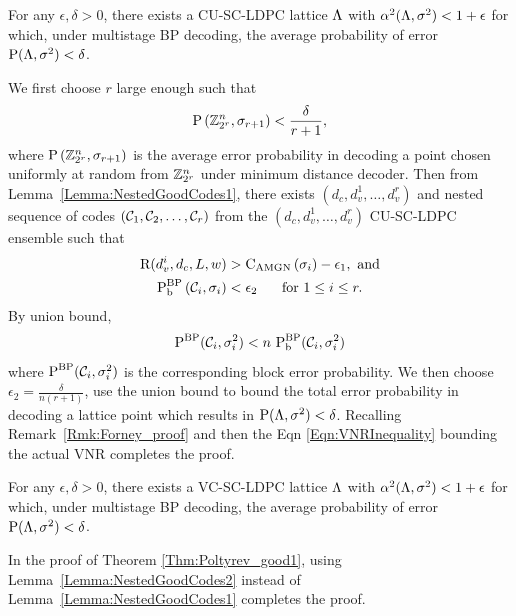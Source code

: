 \documentclass[journal,twocolumn]{IEEEtran}
\begin{document}
\begin{theorem}\label{Thm:Poltyrev_good1}
   For any $\epsilon,\delta>0$, there exists a CU-SC-LDPC lattice $\Lambda$ with $\alpha^2(\Lambda,\sigma^2)<1+\epsilon$ for which, under multistage BP decoding, the average probability of error $\text{P}(\Lambda,\sigma^{2})<\delta$.
\end{theorem}
\begin{IEEEproof}
We first choose $r$ large enough such that 
\begin{equation}
\text{P}\left(\mathbb{Z}_{2^{r}}^{n},\sigma_{r+1}\right)<\frac{\delta}{r+1},\notag
\end{equation}
where $\text{P}\left(\mathbb{Z}_{2^{r}}^{n},\sigma_{r+1}\right)$ is the average error probability in decoding a point chosen uniformly at random from $\mathbb{Z}_{2^{r}}^{n}$ under minimum distance decoder. 
Then from Lemma~\ref{Lemma:NestedGoodCodes1}, there exists $(d_{c},d_{v}^{1},\ldots,d_{v}^{r})$ and nested sequence of codes $(\mathcal{C}_{1}, \mathcal{C}_{2}, \ldots,\mathcal{C}_{r})$ from the $(d_{c},d_{v}^{1},\ldots,d_{v}^{r})$ CU-SC-LDPC ensemble such that 
\begin{align}
\text{R}(d_{v}^{i},d_{c},L,w)&>\text{C}_{\text{AMGN}}\left(\sigma_{i}\right)-\epsilon_{1}, \text{ and} \\
\text{P}_{\text{b}}^{\text{BP}}\left(\mathcal{C}_{i},\sigma_{i}\right)&<\epsilon_{2} \hspace{0.5cm}\text{ for }1\leq i \leq r.
\end{align}	
By union bound,  %
\begin{equation}\label{Eqn:Ineq-UncodedLevel}
\text{P}^{\text{BP}}(\mathcal{C}_{i},\sigma^{2}_{i})< n~\text{P}_{\text{b}}^{\text{BP}}(\mathcal{C}_{i},\sigma^{2}_{i})
\end{equation}
 where $\text{P}^{\text{BP}}(\mathcal{C}_{i},\sigma^{2}_{i})$ is the corresponding block error probability. We then choose $\epsilon_{2}=\frac{\delta}{n(r+1)}$, use the union bound to bound the total error probability in decoding a lattice point which results in $\text{P}(\Lambda,\sigma^{2})<\delta$. Recalling Remark~\ref{Rmk:Forney_proof} and then the Eqn \eqref{Eqn:VNRInequality} bounding the actual VNR completes the proof.
\end{IEEEproof}

\begin{theorem}\label{Thm:Poltyrev_good2}
   For any $\epsilon,\delta>0$, there exists a VC-SC-LDPC lattice $\Lambda$ with $\alpha^2(\Lambda,\sigma^2)<1+\epsilon$ for which, under multistage BP decoding, the average probability of error $\text{P}(\Lambda,\sigma^{2})<\delta$.
\end{theorem}
\begin{IEEEproof}
In the proof of Theorem \ref{Thm:Poltyrev_good1}, using Lemma~\ref{Lemma:NestedGoodCodes2} instead of Lemma~\ref{Lemma:NestedGoodCodes1} completes the proof. \end{IEEEproof}
\end{document}
